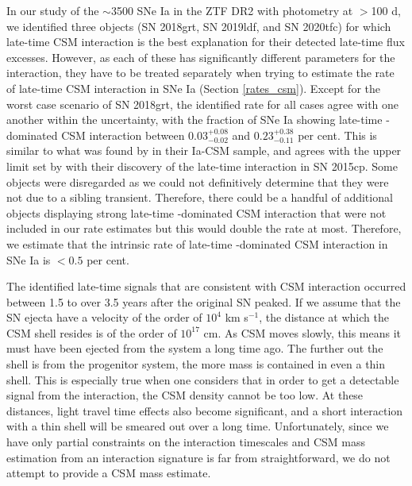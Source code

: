 \documentclass[a4paper,oneside,12pt, class=Latex/Classes/PhDthesisPSnPDF, crop=false]{standalone}
\begin{document}
In our study of the $\sim$3500 SNe Ia in the ZTF DR2 with photometry at $>$100 d, we identified three objects (SN 2018grt, SN 2019ldf, and SN 2020tfc) for which late-time CSM interaction is the best explanation for their detected late-time flux excesses. However, as each of these has significantly different parameters for the interaction, they have to be treated separately when trying to estimate the rate of late-time CSM interaction in SNe Ia (Section \ref{rates_csm}). Except for the worst case scenario of SN 2018grt, the identified rate for all cases agree with one another within the uncertainty, with the fraction of SNe Ia showing late-time \Halpha-dominated CSM interaction between $0.03^{+0.08}_{-0.02}$ and $0.23^{+0.38}_{-0.11}$ per cent. This is similar to what was found by \citet{Ia-CSM_BTS} in their Ia-CSM sample, and agrees with the upper limit set by \citet{2015cp} with their discovery of the late-time interaction in SN 2015cp. Some objects were disregarded as we could not definitively determine that they were not due to a sibling transient. Therefore, there could be a handful of additional objects displaying strong late-time \Halpha-dominated CSM interaction that were not included in our rate estimates but this would double the rate at most. Therefore, we estimate that the intrinsic rate of late-time \Halpha-dominated CSM interaction in SNe Ia is $<0.5$ per cent.

The identified late-time signals that are consistent with CSM interaction occurred between 1.5 to over 3.5 years after the original SN peaked. If we assume that the SN ejecta have a velocity of the order of $10^4$ km s$^{-1}$, the distance at which the CSM shell resides is of the order of $10^{17}$ cm. As CSM moves slowly, this means it must have been ejected from the system a long time ago. The further out the shell is from the progenitor system, the more mass is contained in even a thin shell. This is especially true when one considers that in order to get a detectable signal from the interaction, the CSM density cannot be too low. At these distances, light travel time effects also become significant, and a short interaction with a thin shell will be smeared out over a long time. Unfortunately, since we have only partial constraints on the interaction timescales and CSM mass estimation from an interaction signature is far from straightforward, we do not attempt to provide a CSM mass estimate.  
\end{document}
